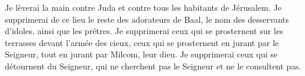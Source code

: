 Je lèverai la main contre Juda et contre tous les habitants de Jérusalem.
Je supprimerai de ce lieu le reste des adorateurs de Baal,
	le nom des desservants d’idoles, ainsi que les prêtres.
Je supprimerai ceux qui se prosternent sur les terrasses devant l’armée des cieux,
	ceux qui se prosternent en jurant par le Seigneur,
	tout en jurant par Milcom, leur dieu.
Je supprimerai ceux qui se détournent du Seigneur,
	qui ne cherchent pas le Seigneur et ne le consultent pas.
